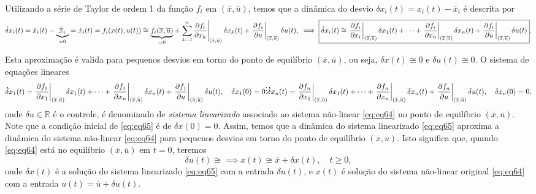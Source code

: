 \documentclass[
]{book}
\theoremstyle{definition}
\theoremstyle{definition}
\theoremstyle{definition}
\theoremstyle{remark}
\begin{document}
Utilizando a série de Taylor de ordem 1 da função \(f_i\) em \((\overline{x}, \overline{u})\), temos que a dinâmica do desvio \(\delta x_i(t) = x_i(t)-\overline{x}_i\) é descrita por
\[
\dot{\delta}x_i(t) = \dot{x}_i(t) - \underbrace{\dot{\overline{x}}_i}_{=0} = \dot{x}_i(t) = f_i(x(t),u(t)) \cong \underbrace{f_i(\overline{x}, \overline{u})}_{=0} + 
\left.\sum_{k=1}^n{\frac{\partial f_i}{\partial x_k}}\right|_{(\overline{x}, \overline{u})}
\delta x_k(t) + 
\left.\frac{\partial f_i}{\partial u}\right|_{(\overline{x}, \overline{u})}
\delta u(t), \\
\implies \boxed{\dot{\delta}x_i(t) \cong
\left.\frac{\partial f_i}{\partial x_i}\right|_{(\overline{x}, \overline{u})}\delta x_1(t) + \dots + \left.\frac{\partial f_i}{\partial x_n}\right|_{(\overline{x}, \overline{u})}\delta x_n(t) + \left.\frac{\partial f_i}{\partial u}\right|_{(\overline{x}, \overline{u})}\delta u(t)}.
\]

Esta aproximação é valida para pequenos desvios em torno do ponto de equilíbrio \((\overline{x}, \overline{u})\), ou seja, \(\delta x(t) \cong 0\) e \(\delta u(t) \cong 0\). O sistema de equações lineares
\[
\dot{\delta}x_1(t) = \left.\frac{\partial f_1}{\partial x_1}\right|_{(\overline{x}, \overline{u})}\delta x_1(t) + \dots + \left.\frac{\partial f_1}{\partial x_n}\right|_{(\overline{x}, \overline{u})}\delta x_n(t) + \left.\frac{\partial f_1}{\partial u}\right|_{(\overline{x}, \overline{u})}\delta u(t), \quad \delta x_1(0) = 0 \\
\vdots \label{eq:eq65}\\
\dot{\delta}x_n(t) = \left.\frac{\partial f_n}{\partial x_1}\right|_{(\overline{x}, \overline{u})}\delta x_1(t) + \dots + \left.\frac{\partial f_n}{\partial x_n}\right|_{(\overline{x}, \overline{u})}\delta x_n(t) + \left.\frac{\partial f_n}{\partial u}\right|_{(\overline{x}, \overline{u})}\delta u(t), \quad \delta x_n(0) = 0,
\]
onde \(\delta u \in \mathbb{R}\) é o controle, é denominado de \emph{sistema linearizado} associado ao sistema não-linear \eqref{eq:eq64} no ponto de equilíbrio \((\overline{x}, \overline{u})\). Note que a condição inicial de \eqref{eq:eq65} é de \(\delta x(0) = 0\). Assim, temos que a dinâmica do sistema linearizado \eqref{eq:eq65} aproxima a dinâmica do sistema não-linear \eqref{eq:eq64} para pequenos desvios em torno do ponto de equilíbrio \((\overline{x}, \overline{u})\). Isto significa que, quando \eqref{eq:eq64} está no equilíbrio \((\overline{x}, \overline{u})\) em \(t=0\), teremos
\[
\boxed{\delta u(t)  \cong \implies x(t) \cong \overline{x} + \delta x(t), \quad t \geq 0},
\]
onde \(\delta x(t)\) é a solução do sistema linearizado \eqref{eq:eq65} com a entrada \(\delta u(t)\), e \(x(t)\) é solução do sistema não-linear original \eqref{eq:eq64} com a entrada \(u(t) = \overline{u} +\delta u(t)\).
\end{document}
